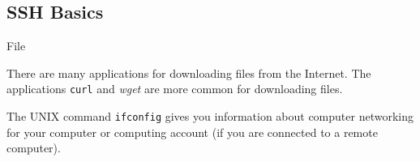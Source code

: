 \subsection{SSH Basics}
\label{ssec:SSHBasics}

File 






There are many applications for downloading files from the Internet. The applications {\tt curl} and {\it wget} are more common for downloading files.

The UNIX command {\tt ifconfig} gives you information about computer networking for your computer or computing account (if you are connected to a remote computer).











































